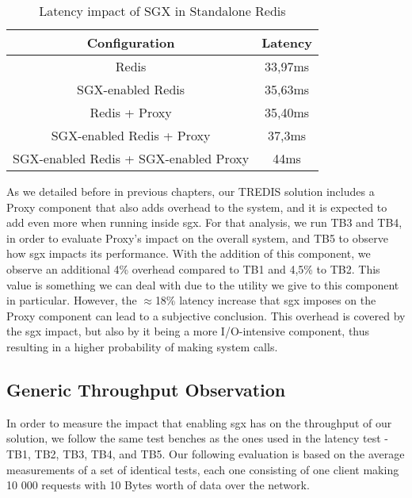 \begin{table}[ht]
	\caption{Latency impact of SGX in Standalone Redis} %
	\centering %
	\begin{tabular}{c c} %
		\hline\hline %
		\textbf{Configuration} & \textbf{Latency} \\ [0.5ex] %
		\hline
		Redis & 33,97ms\\
		\hline
		SGX-enabled Redis & 35,63ms \\
		\hline
		Redis + Proxy & 35,40ms \\
		\hline
	    SGX-enabled Redis + Proxy & 37,3ms \\
		\hline %
	    SGX-enabled Redis + SGX-enabled Proxy & 44ms\\ [1ex] %
		\hline %
	\end{tabular}
	\label{table:latencySingleRedis} %
\end{table}

As we detailed before in previous chapters, our TREDIS solution includes a Proxy component that also adds overhead to the system, and it is expected to add even more when running inside \gls{sgx}. For that analysis, we run TB3 and TB4, in order to evaluate Proxy's impact on the overall system, and TB5 to observe how \gls{sgx} impacts its performance. With the addition of this component, we observe an additional 4\% overhead compared to TB1 and 4,5\% to TB2. This value is something we can deal with due to the utility we give to this component in particular. However, the $\approx$18\% latency increase that \gls{sgx} imposes on the Proxy component can lead to a subjective conclusion. This overhead is covered by the \gls{sgx} impact, but also by it being a more I/O-intensive component, thus resulting in a higher probability of making system calls.

\subsection{Generic Throughput Observation}

In order to measure the impact that enabling \gls{sgx} has on the throughput of our solution, we follow the same test benches as the ones used in the latency test - TB1, TB2, TB3, TB4, and TB5. Our following evaluation is based on the average measurements of a set of identical tests, each one consisting of one client making 10 000 requests with 10 Bytes worth of data over the network.

